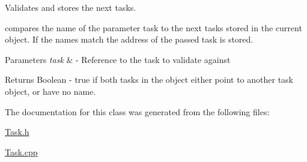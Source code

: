 Validates and stores the next tasks. 

compares the name of the parameter task to the next tasks stored in the current object. If the names match the address of the passed task is stored. 
\begin{DoxyParams}{Parameters}
{\em task} & -\/ Reference to the task to validate against \\
\hline
\end{DoxyParams}
\begin{DoxyReturn}{Returns}
Boolean -\/ true if both tasks in the object either point to another task object, or have no name. 
\end{DoxyReturn}


The documentation for this class was generated from the following files\+:\begin{DoxyCompactItemize}
\item 
\mbox{\hyperlink{_task_8h}{Task.\+h}}\item 
\mbox{\hyperlink{_task_8cpp}{Task.\+cpp}}\end{DoxyCompactItemize}
